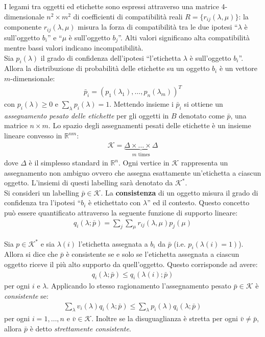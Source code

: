 	I legami tra oggetti ed etichette sono espressi attraverso una matrice 4-dimensionale $n^2 \times m^2$ di coefficienti di compatibilità reali $R = \{r_{ij}(\lambda, \mu)\}$: la componente $r_{ij}(\lambda, \mu)$ misura la forza di compatibilità tra le due ipotesi “$\lambda$ è sull'oggetto $b_i$” e “$\mu$ è sull'oggetto $b_j$”. Alti valori significano alta compatibilità mentre bassi valori indicano incompatibilità.\\
	
	Sia $p_i(\lambda)$ il grado di confidenza dell'ipotesi “l'etichetta $\lambda$ è sull'oggetto $b_i$”. Allora la distribuzione di probabilità delle etichette su un oggetto $b_i$ è un vettore $m$-dimensionale:
	\begin{align*}
		\bar{p}_i = (p_1 (\lambda_1), \dots, p_n(\lambda_m))^T
	\end{align*}
	con $p_i(\lambda) \geq 0$ e $\sum_\lambda p_i(\lambda) = 1$. Mettendo insieme i $\bar{p}_i$ si ottiene un \emph{assegnamento pesato delle etichette} per gli oggetti in $B$ denotato come $\bar{p}$, una matrice $n \times m$. Lo spazio degli assegnamenti pesati delle etichette è un insieme lineare convesso in $\mathbb{R}^{nm}$:
	\begin{align*}
		\mathcal{K} = \underbrace{\Delta \times \dots \times \Delta}_\textrm{$m$ times}
	\end{align*}
	dove $\Delta$ è il simplesso standard in $\mathbb{R}^n$. Ogni vertice in $\mathcal{K}$ rappresenta un assegnamento non ambiguo ovvero che assegna esattamente un'etichetta a ciascun oggetto. L'insiemi di questi labelling sarà denotato da $\mathcal{K}^*$.\\
	
	Si consideri un labelling $\bar{p} \in \mathcal{K}$. La \textbf{consistenza} di un oggetto misura il grado di confidenza tra l'ipotesi “$b_i$ è etichettato con $\lambda$” ed il contesto. Questo concetto può essere quantificato attraverso la seguente funzione di supporto lineare:
	\begin{align*}
		q_i(\lambda; \bar{p}) = \sum_j \sum_\mu r_{ij} (\lambda, \mu) p_j(\mu)
	\end{align*}
	
	\newpage
	
	Sia $p \in \mathcal{K}^*$ e sia $\lambda(i)$ l'etichetta assegnata a $b_i$ da $\bar{p}$ (i.e. $p_i(\lambda(i) = 1)$). Allora si dice che $\bar{p}$ è consistente se e solo se l'etichetta assegnata a ciascun oggetto riceve il più alto supporto da quell'oggetto. Questo corrisponde ad avere:
	\begin{align*}
		q_i(\lambda; \bar{p}) \leq q_i(\lambda(i); \bar{p})
	\end{align*}
	per ogni $i$ e $\lambda$. Applicando lo stesso ragionamento l'assegnamento pesato $\bar{p} \in \mathcal{K}$ è \emph{consistente} se:
	\begin{align*}
		\sum_\lambda v_i(\lambda)q_i(\lambda; \bar{p}) \leq \sum_\lambda p_i(\lambda) q_i(\lambda; \bar{p})
	\end{align*}
	per ogni $i = 1, \dots, n$ e $\bar{v} \in \mathcal{K}$. Inoltre se la disuguaglianza è stretta per ogni $\bar{v} \neq \bar{p}$, allora $\bar{p}$ è detto \emph{strettamente consistente}.\\
	
